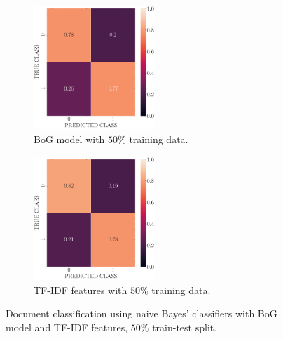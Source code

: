 \documentclass[12pt, a4 paper]{article}
\begin{document}
\begin{figure}[!htbp]
\centering
    \begin{subfigure}[!htbp]{0.24\textwidth}
       \centering
       \includegraphics[width=1.8in]{../results/ex4/conf_mtx_bog_train_test_split_0.5.pdf}
       \caption{BoG model with $50\%$ training data.}
       \label{fig:bog_50}
    \end{subfigure}
\quad \quad
    \begin{subfigure}[!htbp]{0.24\textwidth}
       \centering
       \includegraphics[width=1.8in]{../results/ex4/conf_mtx_tfidf_train_test_split_0.5.pdf}
       \caption{TF-IDF features with $50\%$ training data.}
       \label{fig:tfidf_50}
    \end{subfigure}
\caption{Document classification using naive Bayes' classifiers with BoG model and TF-IDF features, $50\%$ train-test split.}
\label{fig:ex4_50}
\end{figure}
\end{document}
